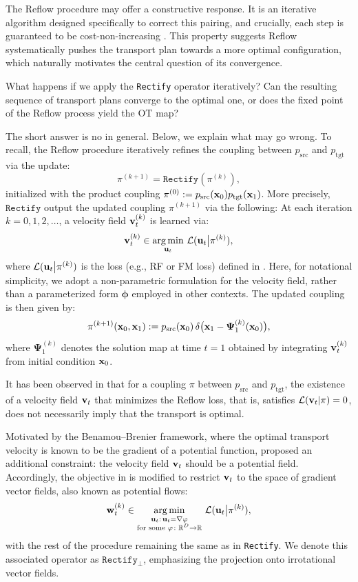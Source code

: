 The Reflow procedure may offer a constructive response. It is an iterative algorithm designed specifically to correct this pairing, and crucially, each step is guaranteed to be cost-non-increasing \citep{liu2022flow}. This property suggests Reflow systematically pushes the transport plan towards a more optimal configuration, which naturally motivates the central question of its convergence.
\begin{question}
    What happens if we apply the \texttt{Rectify} operator iteratively? Can the resulting sequence of transport plans converge to the optimal one, or does the fixed point of the Reflow process yield the OT map?
\end{question}
The short answer is no in general. Below, we explain what may go wrong. To recall, the Reflow procedure iteratively refines the coupling between $p_{\mathrm{src}}$ and $p_{\mathrm{tgt}}$ via the update:
\[
\pi^{(k+1)} = \texttt{Rectify}(\pi^{(k)}),
\]
initialized with the product coupling $\pi^{(0)} := p_{\mathrm{src}}({\mathbf{x}}_0) p_{\mathrm{tgt}}({\mathbf{x}}_1)$. More precisely, $\texttt{Rectify}$ output the updated coupling $\pi^{(k+1)}$ via the following: At each iteration $k = 0, 1, 2, \ldots$, a velocity field ${\mathbf{v}}_t^{(k)}$ is learned via:
\[
{\mathbf{v}}_t^{(k)} \in \operatorname*{arg\,min}_{{\mathbf{u}}_t} \, \mathcal{L}({\mathbf{u}}_t\big\vert\pi^{(k)}),
\]
where $\mathcal{L}({\mathbf{u}}_t\big\vert\pi^{(k)})$ is the loss (e.g., RF or FM loss) defined in . Here, for notational simplicity, we adopt a non-parametric formulation for the velocity field, rather than a parameterized form $\bm{\phi}$ employed in other contexts.
The updated coupling is then given by:
\[
\pi^{(k+1)}({\mathbf{x}}_0, {\mathbf{x}}_1) := p_{\mathrm{src}}({\mathbf{x}}_0)\, \delta\big({\mathbf{x}}_1 - \bm{\Psi}_1^{(k)}({\mathbf{x}}_0)\big),
\]
where $\bm{\Psi}_1^{(k)}$ denotes the solution map at time $t=1$ obtained by integrating ${\mathbf{v}}_t^{(k)}$ from initial condition ${\mathbf{x}}_0$.

It has been observed in \citep{liu2022flow} that for a coupling $\pi$ between $p_{\mathrm{src}}$ and $p_{\mathrm{tgt}}$, the existence of a velocity field ${\mathbf{v}}_t$ that minimizes the Reflow loss, that is, satisfies $\mathcal{L}({\mathbf{v}}_t |\pi) = 0$, does not necessarily imply that the transport is optimal. 



Motivated by the Benamou–Brenier framework, where the optimal transport velocity is known to be the gradient of a potential function, \citet{liu2022rectified} proposed an additional constraint: the velocity field ${\mathbf{v}}_t$ should be a potential field. Accordingly, the objective in  is modified to restrict ${\mathbf{v}}_t$ to the space of gradient vector fields, also known as potential flows:
\begin{align}\label{eq:reflow-loss-gradient}
    {\mathbf{w}}_t^{(k)} \in \operatorname*{arg\,min}_{\substack{{\mathbf{u}}_t:\, {\mathbf{u}}_t=\nabla\varphi \\ \text{for some }\varphi\colon\mathbb{R}^D\to\mathbb{R}}} \, \mathcal{L}({\mathbf{u}}_t\big\vert\pi^{(k)}),
\end{align}
with the rest of the procedure remaining the same as in \texttt{Rectify}.
We denote this associated operator as $\texttt{Rectify}_{\perp}$, emphasizing the projection onto irrotational vector fields. 

